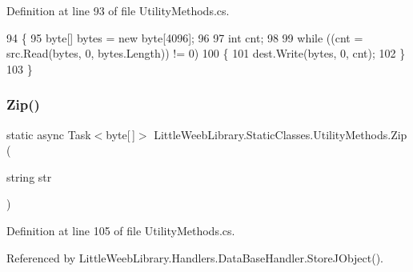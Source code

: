 Definition at line 93 of file Utility\+Methods.\+cs.


\begin{DoxyCode}
94         \{
95             byte[] bytes = \textcolor{keyword}{new} byte[4096];
96 
97             \textcolor{keywordtype}{int} cnt;
98 
99             \textcolor{keywordflow}{while} ((cnt = src.Read(bytes, 0, bytes.Length)) != 0)
100             \{
101                 dest.Write(bytes, 0, cnt);
102             \}
103         \}
\end{DoxyCode}
\mbox{\label{class_little_weeb_library_1_1_static_classes_1_1_utility_methods_a16933213071d531063b29979e7b55fe8}} 
\subsubsection{\texorpdfstring{Zip()}{Zip()}}
{\footnotesize\ttfamily static async Task$<$byte\mbox{[}$\,$\mbox{]}$>$ Little\+Weeb\+Library.\+Static\+Classes.\+Utility\+Methods.\+Zip (\begin{DoxyParamCaption}\item[{string}]{str }\end{DoxyParamCaption})\hspace{0.3cm}{\ttfamily [static]}}



Definition at line 105 of file Utility\+Methods.\+cs.



Referenced by Little\+Weeb\+Library.\+Handlers.\+Data\+Base\+Handler.\+Store\+J\+Object().


